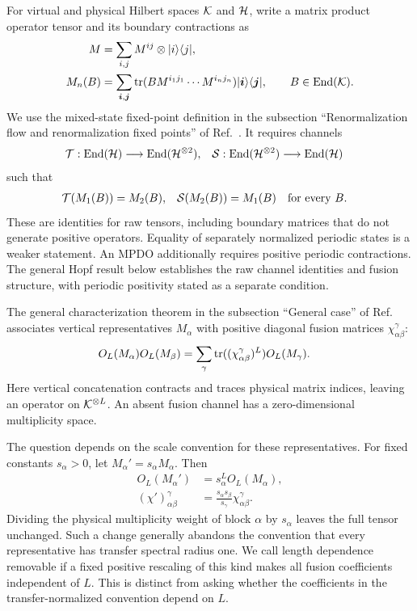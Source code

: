 \documentclass[aps,pra,reprint,nofootinbib,onecolumn]{revtex4-2}
\begin{document}
For virtual and physical Hilbert spaces $\mathcal{K}$ and $\mathcal{H}$, write a matrix product operator tensor and its boundary contractions as
\begin{align}
	M      & =\sum_{i,j}M^{ij}\otimes\lvert i\rangle\langle j\rvert,
	\\
	M_n(B) & =\sum_{\boldsymbol i,\boldsymbol j}
	\operatorname{tr}(BM^{i_1j_1}\cdots M^{i_nj_n})
	\lvert\boldsymbol i\rangle\langle\boldsymbol j\rvert,
	\qquad B\in\operatorname{End}(\mathcal{K}).
	\label{eq:boundary}
\end{align}
We use the mixed-state fixed-point definition in the subsection
``Renormalization flow and renormalization fixed points'' of
Ref.~\cite{CPSV}. It requires channels
\begin{align}
	\mathcal{T} & :\operatorname{End}(\mathcal{H})\longrightarrow\operatorname{End}(\mathcal{H}^{\otimes2}),
	      &
	\mathcal{S} & :\operatorname{End}(\mathcal{H}^{\otimes2})\longrightarrow\operatorname{End}(\mathcal{H})
\end{align}
such that
\begin{align}
	\mathcal{T}(M_1(B)) & =M_2(B),
	              &
	\mathcal{S}(M_2(B)) & =M_1(B)
	\quad\text{for every }B.
	\label{eq:rfp}
\end{align}
These are identities for raw tensors, including boundary matrices that
do not generate positive operators. Equality of separately normalized
periodic states is a weaker statement. An MPDO additionally requires
positive periodic contractions. The general Hopf result below establishes
the raw channel identities and fusion structure, with periodic positivity
stated as a separate condition.

The general characterization theorem in the subsection ``General case''
of Ref.~\cite{CPSV} associates vertical representatives $M_\alpha$
with positive diagonal fusion matrices $\chi_{\alpha\beta}^{\gamma}$:
\begin{align}
	O_L(M_\alpha)O_L(M_\beta)
	 & =\sum_\gamma
	\operatorname{tr}((\chi_{\alpha\beta}^{\gamma})^L)O_L(M_\gamma).
	\label{eq:fusion}
\end{align}
Here vertical concatenation contracts and traces physical matrix
indices, leaving an operator on $\mathcal{K}^{\otimes L}$. An absent fusion
channel has a zero-dimensional multiplicity space.

The question depends on the scale convention for these representatives.
For fixed constants $s_\alpha>0$, let $M_\alpha'=s_\alpha M_\alpha$.
Then
\begin{align}
	O_L(M_\alpha') & =s_\alpha^L O_L(M_\alpha),
	\\
	(\chi')_{\alpha\beta}^{\gamma}
	               & =\frac{s_\alpha s_\beta}{s_\gamma}
	\chi_{\alpha\beta}^{\gamma}.
	\label{eq:rescale}
\end{align}
Dividing the physical multiplicity weight of block $\alpha$ by
$s_\alpha$ leaves the full tensor unchanged. Such a change generally
abandons the convention that every representative has transfer spectral
radius one. We call length dependence removable if a fixed positive
rescaling of this kind makes all fusion coefficients independent of
$L$. This is distinct from asking whether the coefficients in the
transfer-normalized convention depend on $L$.
\end{document}
